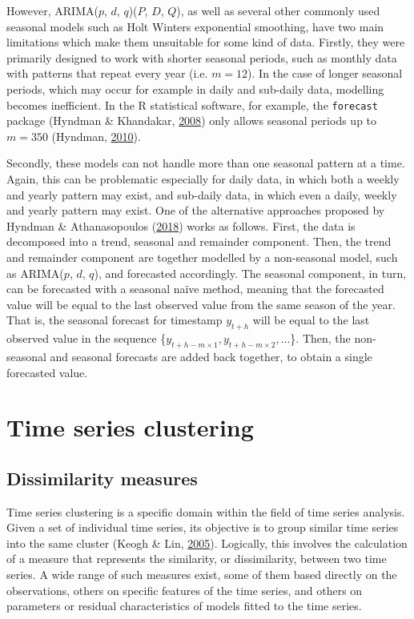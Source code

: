 \documentclass[12pt,oneside]{reedthesis}
\begin{document}
However, ARIMA(\(p\), \(d\), \(q\))(\(P\), \(D\), \(Q\)), as well as
several other commonly used seasonal models such as Holt Winters
exponential smoothing, have two main limitations which make them
unsuitable for some kind of data. Firstly, they were primarily designed
to work with shorter seasonal periods, such as monthly data with
patterns that repeat every year (i.e. \(m = 12\)). In the case of longer
seasonal periods, which may occur for example in daily and sub-daily
data, modelling becomes inefficient. In the R statistical software, for
example, the \texttt{forecast} package (Hyndman \& Khandakar,
\protect\hyperlink{ref-forecast}{2008}) only allows seasonal periods up
to \(m = 350\) (Hyndman, \protect\hyperlink{ref-hyndmanblog}{2010}).

Secondly, these models can not handle more than one seasonal pattern at
a time. Again, this can be problematic especially for daily data, in
which both a weekly and yearly pattern may exist, and sub-daily data, in
which even a daily, weekly and yearly pattern may exist. One of the
alternative approaches proposed by Hyndman \& Athanasopoulos
(\protect\hyperlink{ref-hyndman2018fpp}{2018}) works as follows. First,
the data is decomposed into a trend, seasonal and remainder component.
Then, the trend and remainder component are together modelled by a
non-seasonal model, such as ARIMA(\(p\), \(d\), \(q\)), and forecasted
accordingly. The seasonal component, in turn, can be forecasted with a
seasonal naïve method, meaning that the forecasted value will be equal
to the last observed value from the same season of the year. That is,
the seasonal forecast for timestamp \(y_{t+h}\) will be equal to the
last observed value in the sequence
\{\(y_{t+h-m \times 1}, y_{t+h-m \times 2}, ...\)\}. Then, the
non-seasonal and seasonal forecasts are added back together, to obtain a
single forecasted value.

\section{Time series clustering}\label{time-series-clustering}

\subsection{Dissimilarity measures}\label{dissimilarity-measures}

Time series clustering is a specific domain within the field of time
series analysis. Given a set of individual time series, its objective is
to group similar time series into the same cluster (Keogh \& Lin,
\protect\hyperlink{ref-keogh2005}{2005}). Logically, this involves the
calculation of a measure that represents the similarity, or
dissimilarity, between two time series. A wide range of such measures
exist, some of them based directly on the observations, others on
specific features of the time series, and others on parameters or
residual characteristics of models fitted to the time series.
\end{document}
